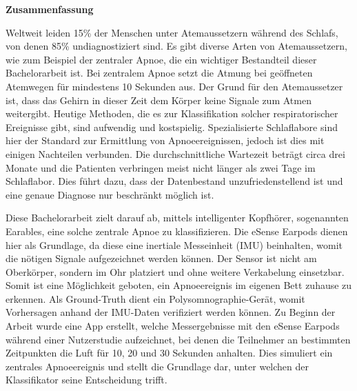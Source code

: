 % 
% 

\vspace*{1em}
\begin{center}
	\textbf{Zusammenfassung}
\end{center}
\par
Weltweit leiden 15\% der Menschen unter Atemaussetzern während des Schlafs, von denen 85\% undiagnostiziert sind. 
Es gibt diverse Arten von Atemaussetzern, wie zum Beispiel der zentraler Apnoe, die ein wichtiger Bestandteil dieser Bachelorarbeit ist.
Bei zentralem Apnoe setzt die Atmung bei geöffneten Atemwegen für mindestens 10 Sekunden aus. Der Grund für den Atemaussetzer ist, dass das Gehirn in dieser Zeit dem Körper keine Signale zum Atmen weitergibt.
Heutige Methoden, die es zur Klassifikation solcher respiratorischer Ereignisse gibt, sind aufwendig und kostspielig. 
Spezialisierte Schlaflabore sind hier der Standard zur Ermittlung von Apnoeereignissen, jedoch ist dies mit einigen Nachteilen verbunden.
Die durchschnittliche Wartezeit beträgt circa drei Monate und die Patienten verbringen meist nicht länger als zwei Tage im Schlaflabor.
Dies führt dazu, dass der Datenbestand unzufriedenstellend ist und eine genaue Diagnose nur beschränkt möglich ist.

Diese Bachelorarbeit zielt darauf ab, mittels intelligenter Kopfhörer, sogenannten Earables, eine solche zentrale Apnoe zu klassifizieren.
Die eSense Earpods dienen hier als Grundlage, da diese eine inertiale Messeinheit (IMU) beinhalten, womit die nötigen Signale aufgezeichnet werden können. 
Der Sensor ist nicht am Oberkörper, sondern im Ohr platziert und ohne weitere Verkabelung einsetzbar.
Somit ist eine Möglichkeit geboten, ein Apnoeereignis im eigenen Bett zuhause zu erkennen.
Als Ground-Truth dient ein Polysomnographie-Gerät, womit Vorhersagen anhand der IMU-Daten verifiziert werden können.
Zu Beginn der Arbeit wurde eine App erstellt, welche Messergebnisse mit den eSense Earpods während einer Nutzerstudie aufzeichnet, bei denen die Teilnehmer an bestimmten Zeitpunkten die Luft für 10, 20 und 30 Sekunden anhalten.
Dies simuliert ein zentrales Apnoeereignis und stellt die Grundlage dar, unter welchen der Klassifikator seine Entscheidung trifft.


